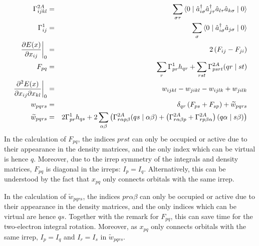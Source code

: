 \documentclass[11pt,a4paper]{article}
\begin{document}
\begin{eqnarray}
\Gamma^{2A}_{ijkl} & = & \sum\limits_{\sigma \tau} \braket{ 0 \mid \hat{a}^{\dagger}_{i \sigma} \hat{a}_{j \tau}^{\dagger} \hat{a}_{l \tau} \hat{a}_{k \sigma} \mid 0} \\
\Gamma^1_{ij} & = & \sum\limits_{\sigma} \braket{ 0 \mid \hat{a}^{\dagger}_{i \sigma} \hat{a}_{j \sigma} \mid 0} \\
\left. \frac{\partial E(x)}{\partial x_{ij}} \right|_{0} & = & 2 \left( F_{ij} - F_{ji} \right) \\
F_{pq} & = & \sum\limits_{r} \Gamma_{pr}^{1} h_{qr} + \sum\limits_{rst} \Gamma^{2A}_{psrt} (qr \mid st) \\
\left. \frac{\partial^2 E(x)}{\partial x_{ij} \partial x_{kl}} \right|_{0} & = & w_{ijkl} - w_{jikl} - w_{ijlk} + w_{jilk} \\
w_{pqrs} & = & \delta_{qr} \left( F_{ps} + F_{sp} \right) + \widetilde{w}_{pqrs} \\
\widetilde{w}_{pqrs} & = & 2 \Gamma^1_{pr} h_{qs} + 2 \sum\limits_{\alpha \beta} \left( \Gamma^{2A}_{r \alpha p \beta} (qs \mid \alpha \beta ) + \left( \Gamma^{2A}_{r \alpha \beta p} + \Gamma^{2A}_{r p \beta \alpha} \right) (q \alpha \mid s \beta ) \right)
\end{eqnarray}
In the calculation of $F_{pq}$, the indices $prst$ can only be occupied or active due to their appearance in the density matrices, and the only index which can be virtual is hence $q$. Moreover, due to the irrep symmetry of the integrals and density matrices, $F_{pq}$ is diagonal in the irreps: $I_p = I_q$. Alternatively, this can be understood by the fact that $x_{pq}$ only connects orbitals with the same irrep.

In the calculation of $\widetilde{w}_{pqrs}$, the indices $pr\alpha\beta$ can only be occupied or active due to their appearance in the density matrices, and the only indices which can be virtual are hence $qs$. Together with the remark for $F_{pq}$, this can save time for the two-electron integral rotation. Moreover, as $x_{pq}$ only connects orbitals with the same irrep, $I_p = I_q$ and $I_r = I_s$ in $\widetilde{w}_{pqrs}$.
\end{document}

